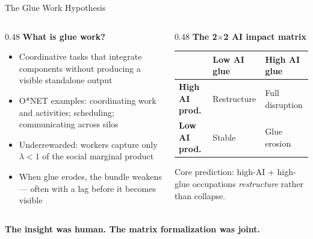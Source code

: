 \documentclass[10pt,english,aspectratio=169]{beamer}
\begin{document}
\begin{frame}{The Glue Work Hypothesis}
\begin{columns}[T]
\begin{column}{0.48\textwidth}
\textbf{What is glue work?}
\begin{itemize}
  \item Coordinative tasks that integrate components without producing a visible standalone output
  \item O*NET examples: coordinating work and activities; scheduling; communicating across silos
  \item Underrewarded: workers capture only $\lambda < 1$ of the social marginal product
  \item When glue erodes, the bundle weakens --- often with a lag before it becomes visible
\end{itemize}
\end{column}
\begin{column}{0.48\textwidth}
\textbf{The 2$\times$2 AI impact matrix}
\vspace{0.2cm}

\small
\begin{tabular}{p{2.0cm}p{1.6cm}p{1.6cm}}
\toprule
 & \textbf{Low AI glue} & \textbf{High AI glue} \\
\midrule
\textbf{High AI prod.} & Restructure & Full disruption \\
\textbf{Low AI prod.} & Stable & Glue erosion \\
\bottomrule
\end{tabular}
\vspace{0.3cm}

\footnotesize{Core prediction: high-AI + high-glue occupations \emph{restructure} rather than collapse.}
\end{column}
\end{columns}
\vspace{0.3cm}
\textbf{The insight was human. The matrix formalization was joint.}
\end{frame}
\end{document}
